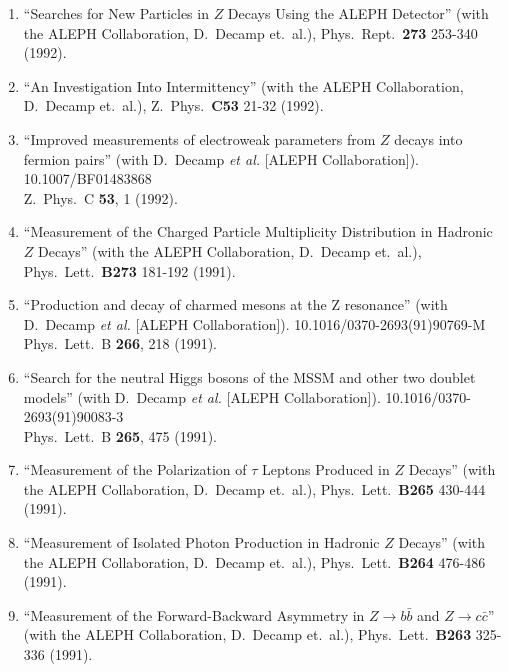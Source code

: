 \begin{enumerate}
\item ``Searches for New Particles in $Z$ Decays Using the
        ALEPH   Detector'' (with the ALEPH Collaboration,
        D.~Decamp et.~al.),   Phys.~Rept.~{\bf 273} 253-340
        (1992).

\item ``An Investigation Into Intermittency'' (with the
        ALEPH   Collaboration, D.~Decamp et.~al.),
        Z.~Phys.~{\bf C53} 21-32 (1992).

\item ``Improved measurements of electroweak parameters from
        $Z$ decays into fermion pairs'' (with D.~Decamp {\it
        et al.}  [ALEPH Collaboration]). 10.1007/BF01483868
        \\{}Z.\ Phys.\ C {\bf 53}, 1 (1992).

\item ``Measurement of the Charged Particle Multiplicity
        Distribution   in Hadronic $Z$ Decays'' (with the
        ALEPH Collaboration, D.~Decamp   et.~al.),
        Phys.~Lett.~{\bf B273} 181-192 (1991).

\item ``Production and decay of charmed mesons at the Z
        resonance'' (with D.~Decamp {\it et al.}  [ALEPH
        Collaboration]). 10.1016/0370-2693(91)90769-M
        \\{}Phys.\ Lett.\ B {\bf 266}, 218 (1991).

\item ``Search for the neutral Higgs bosons of the MSSM and
        other two doublet models'' (with D.~Decamp {\it et
        al.}  [ALEPH Collaboration]).
        10.1016/0370-2693(91)90083-3 \\{}Phys.\ Lett.\ B
        {\bf 265}, 475 (1991).

\item ``Measurement of the Polarization of $\tau$ Leptons
        Produced in   $Z$ Decays'' (with the ALEPH
        Collaboration, D.~Decamp et.~al.),
        Phys.~Lett.~{\bf B265} 430-444 (1991).

\item ``Measurement of Isolated Photon Production in
        Hadronic $Z$   Decays'' (with the ALEPH
        Collaboration, D.~Decamp et.~al.),
        Phys.~Lett.~{\bf B264} 476-486 (1991).

\item ``Measurement of the Forward-Backward Asymmetry in $Z
        \rightarrow b \bar b$ and $Z \rightarrow c \bar c$''
        (with the ALEPH   Collaboration, D.~Decamp et.~al.),
        Phys.~Lett.~{\bf B263} 325-336   (1991).


\end{enumerate}
